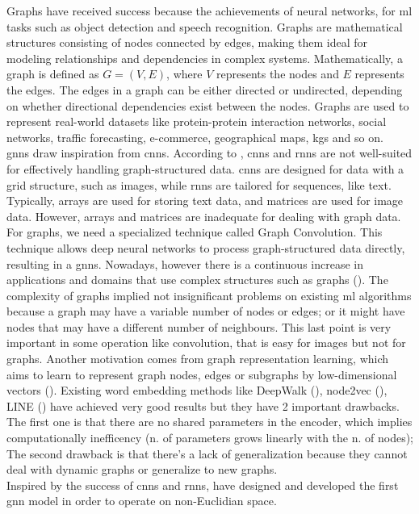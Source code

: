 Graphs have received success because the achievements of neural networks, for \gls{ml} tasks such as object detection and speech recognition.
Graphs are mathematical structures consisting of nodes connected by edges, making them ideal for modeling relationships and dependencies in complex systems.
Mathematically, a graph is defined as $G=(V, E)$, where $V$ represents the nodes and $E$ represents the edges. The edges in a graph can be either directed or undirected, depending on whether directional dependencies exist between the nodes.
Graphs are used to represent real-world datasets like protein-protein interaction networks, social networks, traffic forecasting, e-commerce, geographical maps, \glspl{kg} and so on.
\\\glspl{gnn} draw inspiration from \glspl{cnn}.
According to \cite{Khemani2024}, \glspl{cnn} and \glspl{rnn} are not well-suited for effectively handling graph-structured data.
\glspl{cnn} are designed for data with a grid structure, such as images, while \glspl{rnn} are tailored for sequences, like text.
Typically, arrays are used for storing text data, and matrices are used for image data. However, arrays and matrices are inadequate for dealing with graph data.
For graphs, we need a specialized technique called Graph Convolution. This technique allows deep neural networks to process graph-structured data directly, resulting in a \glspl{gnn}.
Nowadays, however there is a continuous increase in applications and domains that use complex structures such as graphs (\cite{Wu2021}).
The complexity of graphs implied not insignificant problems on existing \gls{ml} algorithms because a graph may have a variable number of nodes or edges; or it might have nodes that may have a different number of neighbours.
This last point is very important in some operation like convolution, that is easy for images but not for graphs.
Another motivation comes from graph representation learning, which aims to learn to represent graph nodes, edges or subgraphs by low-dimensional vectors (\cite{Zhou2020}).
Existing word embedding methods like DeepWalk (\cite{Perozzi2014}), node2vec (\cite{Grover2016}), LINE (\cite{Tang2015}) have achieved very good results but they have 2 important drawbacks. The first one is that there are no shared parameters in the encoder, which implies computationally inefficency (n. of parameters grows linearly with the n. of nodes);
The second drawback is that there's a lack of generalization because they cannot deal with dynamic graphs or generalize to new graphs.
\\Inspired by the success of \glspl{cnn} and \glspl{rnn}, \cite{Gori2005, Scarselli2009} have designed and developed the first \gls{gnn} model in order to operate on non-Euclidian space.
